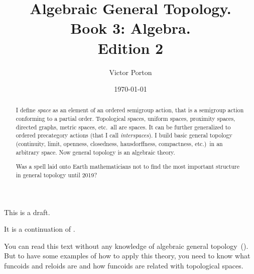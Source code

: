 \documentclass[english,reqno,12pt]{amsbook}
\begin{document}
\title{Algebraic General Topology.\\Book 3: Algebra.\\Edition 2}

\author{Victor Porton}



\date{\today}

\begin{abstract}
I define \emph{space} as an element of an ordered semigroup action, that is a semigroup action conforming to a partial order. Topological spaces, uniform spaces, proximity spaces, directed graphs, metric spaces, etc.\ all are spaces. It can be further generalized to ordered precategory actions (that I call \emph{interspaces}). I build basic general topology (continuity, limit, openness, closedness, hausdorffness, compactness, etc.)\ in an arbitrary space. Now general topology is an algebraic theory.

Was a spell laid onto Earth mathematicians not to find the most important structure in general topology until 2019?
\end{abstract}





\maketitle

\tableofcontents{}

This is a draft.

It is a continuation of \cite{volume-1}.

You can read this text without any knowledge of algebraic general topology~(\cite{volume-1}). But to have some examples of how to apply this theory, you need to know what funcoids and reloids are and how funcoids are related with topological spaces.






\end{document}
